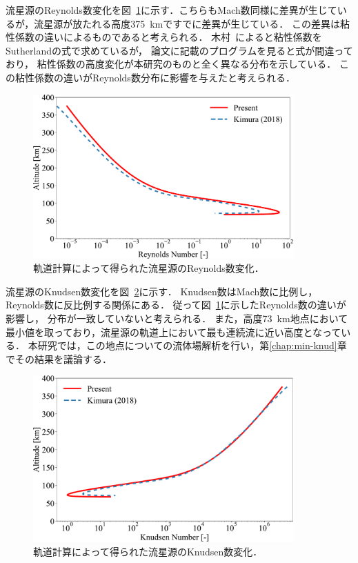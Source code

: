 流星源のReynolds数変化を図~\ref{fig:trajectory-re}に示す．こちらもMach数同様に差異が生じているが，流星源が放たれる高度375~kmですでに差異が生じている．
この差異は粘性係数の違いによるものであると考えられる．
木村~\cite{kimura2018master}によると粘性係数をSutherlandの式で求めているが，
論文に記載のプログラムを見ると式が間違っており，
粘性係数の高度変化が本研究のものと全く異なる分布を示している．
この粘性係数の違いがReynolds数分布に影響を与えたと考えられる．
\begin{figure}[p]
    \centering
    \includegraphics[width=10cm]{fig/trajectory/re.pdf}
    \caption{軌道計算によって得られた流星源のReynolds数変化．}
    \label{fig:trajectory-re}
\end{figure}

流星源のKnudsen数変化を図~\ref{fig:trajectory-kn}に示す．
Knudsen数はMach数に比例し，Reynolds数に反比例する関係にある．
従って図~\ref{fig:trajectory-re}に示したReynolds数の違いが影響し，
分布が一致していないと考えられる．
また，高度73~km地点において最小値を取っており，流星源の軌道上において最も連続流に近い高度となっている．
本研究では，この地点についての流体場解析を行い，第\ref{chap:min-knud}章でその結果を議論する．
\begin{figure}[p]
    \centering
    \includegraphics[width=10cm]{fig/trajectory/kn.pdf}
    \caption{軌道計算によって得られた流星源のKnudsen数変化．}
    \label{fig:trajectory-kn}
\end{figure}

